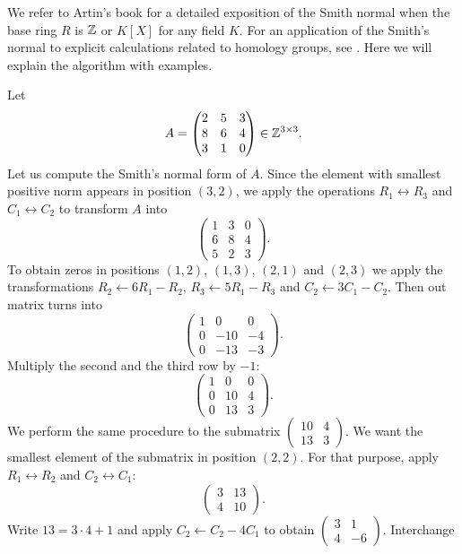 We refer to Artin's book \cite[\S14]{MR1129886} for 
a detailed exposition of the Smith normal
when the base ring $R$ is $\mathbb{Z}$ or
$K[X]$ for any field $K$. For an application 
of the Smith's normal to explicit calculations related to 
homology groups, see \cite[\S11]{MR755006}. 
Here we will explain the algorithm with examples. 

\begin{example}
Let 
\[
A=\begin{pmatrix}
	2 & 5 & 3\\
	8 & 6 & 4\\
	3 & 1 & 0
\end{pmatrix}\in\mathbb{Z}^{3\times3}.
\]	
Let us compute the Smith's normal form of $A$.
Since the element with smallest positive norm appears in position $(3,2)$,
we apply the operations $R_1\leftrightarrow R_3$ and 
$C_1\leftrightarrow C_2$ to transform $A$ into 
\[
\begin{pmatrix}
	1 & 3 & 0\\
	6 & 8 & 4\\
	5 & 2 & 3
\end{pmatrix}.
\]
To obtain zeros in positions $(1,2)$, $(1,3)$, $(2,1)$ and $(2,3)$ we 
apply the transformations 
$R_2\leftarrow 6R_1-R_2$, $R_3\leftarrow 5R_1-R_3$ and 
$C_2\leftarrow 3C_1-C_2$. Then out matrix turns into   
\[
\begin{pmatrix}
	1 & 0 & 0\\
	0 & -10 & -4\\
	0 & -13 & -3
\end{pmatrix}.
\]
Multiply the second and the third row 
by $-1$:
\[
\begin{pmatrix}
	1 & 0 & 0\\
	0 & 10 & 4\\
	0 & 13 & 3
\end{pmatrix}.
\]
We perform the same procedure to the submatrix $\begin{pmatrix}10&4\\13&3\end{pmatrix}$. 
We want the smallest element of the submatrix in position 
$(2,2)$. For that purpose, apply $R_1\leftrightarrow R_2$ and 
$C_2\leftrightarrow C_1$:
\[ 
\begin{pmatrix}
3 & 13\\
4 & 10
\end{pmatrix}.
\]
Write $13=3\cdot 4+1$ and apply 
$C_2\leftarrow C_2-4C_1$ to obtain $\begin{pmatrix}3&1\\4&-6\end{pmatrix}$. Interchange 

\end{example}
